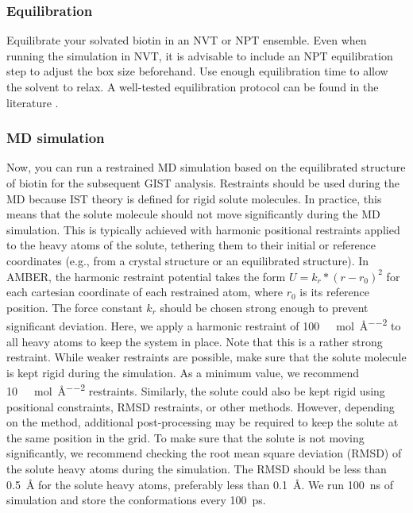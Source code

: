 \documentclass[9pt,tutorial]{livecoms}
\begin{document}
\subsubsection{Equilibration}
Equilibrate your solvated biotin in an NVT or NPT ensemble.
Even when running the simulation in NVT, it is advisable to include an NPT equilibration step to adjust the box size beforehand.
Use enough equilibration time to allow the solvent to relax. 
A well-tested equilibration protocol can be found in the literature \cite{Roe2020-equilibration}.

\subsubsection{MD simulation}
\label{sec:md_simulation}
Now, you can run a restrained MD simulation based on the equilibrated structure of biotin for the subsequent GIST analysis.
Restraints should be used during the MD because IST theory is defined for rigid solute molecules.
In practice, this means that the solute molecule should not move significantly during the MD simulation.
This is typically achieved with harmonic positional restraints applied to the heavy atoms of the solute, tethering them to their initial or reference coordinates (e.g., from a crystal structure or an equilibrated structure). 
In AMBER,  the harmonic restraint potential takes the form $U = k_r * (r - r_0)^2$ for each cartesian coordinate of each restrained atom, where $r_0$ is its reference position. 
The force constant $k_r$ should be chosen strong enough to prevent significant deviation.
Here, we apply a harmonic restraint of \SI{100}{\kilo\calorie\per\mole\per\angstrom\squared} to all heavy atoms to keep the system in place. 
Note that this is a rather strong restraint. 
While weaker restraints are possible, make sure that the solute molecule is kept rigid during the simulation. 
As a minimum value, we recommend \SI{10}{\kilo\calorie\per\mole\per\angstrom\squared} restraints.
Similarly, the solute could also be kept rigid using positional constraints, RMSD restraints, or other methods.
However, depending on the method, additional post-processing may be required to keep the solute at the same position in the grid.
To make sure that the solute is not moving significantly, we recommend checking the root mean square deviation (RMSD) of the solute heavy atoms during the simulation.
The RMSD should be less than \SI{0.5}{\angstrom} for the solute heavy atoms, preferably less than \SI{0.1}{\angstrom}.
We run \SI{100}{\nano\second} of simulation and store the conformations every \SI{100}{\pico\second}.
\end{document}
